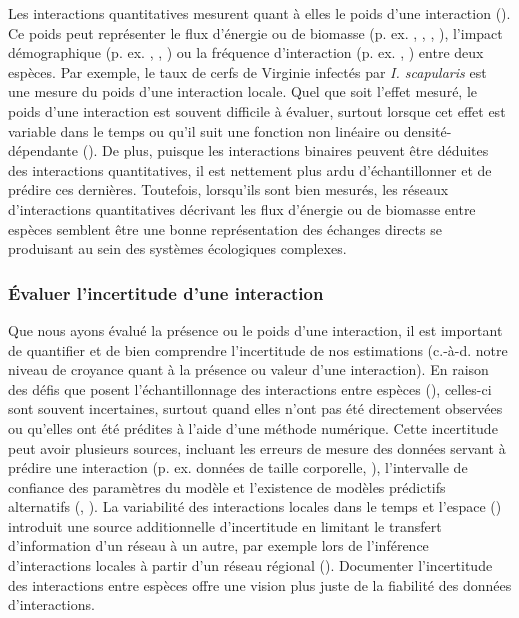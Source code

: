 Les interactions quantitatives mesurent quant à elles le poids d'une interaction
(\cite{Berlow2004Interaction}). Ce poids peut représenter le flux d'énergie ou
de biomasse (p. ex. \cite{Benke2001Food}, \cite{Post2002Long},
\cite{Bersier2002Quantitative}, \cite{Borrett2019Walk}), l'impact démographique
(p. ex. \cite{Paine1992Foodweb}, \cite{Kokkoris2002Variability},
\cite{Emmerson2004Predatorprey}) ou la fréquence d'interaction (p. ex.
\cite{Herrera1989Pollinator}, \cite{Montoya2003Food}) entre deux espèces. Par
exemple, le taux de cerfs de Virginie infectés par \textit{I. scapularis} est
une mesure du poids d'une interaction locale. Quel que soit l'effet mesuré, le
poids d'une interaction est souvent difficile à évaluer, surtout lorsque cet
effet est variable dans le temps ou qu'il suit une fonction non linéaire ou
densité-dépendante (\cite{Wootton2005Measurement}). De plus, puisque les
interactions binaires peuvent être déduites des interactions quantitatives, il
est nettement plus ardu d'échantillonner et de prédire ces dernières. Toutefois,
lorsqu'ils sont bien mesurés, les réseaux d'interactions quantitatives décrivant
les flux d'énergie ou de biomasse entre espèces semblent être une bonne
représentation des échanges directs se produisant au sein des systèmes
écologiques complexes. 

\subsubsection{Évaluer l'incertitude d'une interaction} 

Que nous ayons évalué la présence ou le poids d'une interaction, il est
important de quantifier et de bien comprendre l'incertitude de nos estimations
(c.-à-d. notre niveau de croyance quant à la présence ou valeur d'une
interaction). En raison des défis que posent l'échantillonnage des interactions
entre espèces (\cite{Jordano2016Sampling}), celles-ci sont souvent incertaines,
surtout quand elles n'ont pas été directement observées ou qu'elles ont été
prédites à l'aide d'une méthode numérique. Cette incertitude peut avoir
plusieurs sources, incluant les erreurs de mesure des données servant à prédire
une interaction (p. ex. données de taille corporelle,
\cite{Gravel2013Inferring}), l'intervalle de confiance des paramètres du modèle
et l'existence de modèles prédictifs alternatifs (\cite{Simmonds2022Insights},
\cite{Simmonds2024Recommendations}). La variabilité des interactions locales
dans le temps et l'espace (\cite{Poisot2015Species}) introduit une source
additionnelle d'incertitude en limitant le transfert d'information d'un réseau à
un autre, par exemple lors de l'inférence d'interactions locales à partir d'un
réseau régional (\cite{Dansereau2023Spatially}). Documenter l'incertitude des
interactions entre espèces offre une vision plus juste de la fiabilité des
données d'interactions. 

